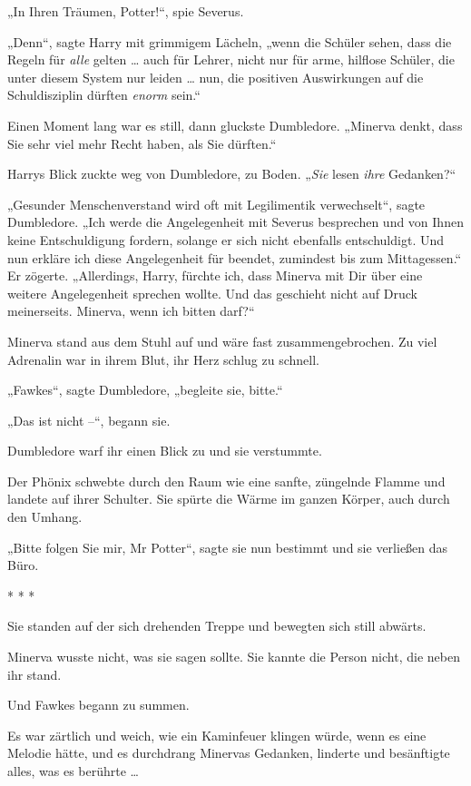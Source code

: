{„In Ihren Träumen, Potter!“, spie Severus.

„Denn“, sagte Harry mit grimmigem Lächeln, „wenn die Schüler sehen, dass die Regeln für \emph{alle} gelten … auch für Lehrer, nicht nur für arme, hilflose Schüler, die unter diesem System nur leiden … nun, die positiven Auswirkungen auf die Schuldisziplin dürften \emph{enorm} sein.“

Einen Moment lang war es still, dann gluckste Dumbledore. „Minerva denkt, dass Sie sehr viel mehr Recht haben, als Sie dürften.“

Harrys Blick zuckte weg von Dumbledore, zu Boden. „\emph{Sie} lesen \emph{ihre} Gedanken?“

„Gesunder Menschenverstand wird oft mit Legilimentik verwechselt“, sagte Dumbledore. „Ich werde die Angelegenheit mit Severus besprechen und von Ihnen keine Entschuldigung fordern, solange er sich nicht ebenfalls entschuldigt. Und nun erkläre ich diese Angelegenheit für beendet, zumindest bis zum Mittagessen.“ Er zögerte. „Allerdings, Harry, fürchte ich, dass Minerva mit Dir über eine weitere Angelegenheit sprechen wollte. Und das geschieht nicht auf Druck meinerseits. Minerva, wenn ich bitten darf?“

Minerva stand aus dem Stuhl auf und wäre fast zusammengebrochen. Zu viel Adrenalin war in ihrem Blut, ihr Herz schlug zu schnell.

„Fawkes“, sagte Dumbledore, „begleite sie, bitte.“

„Das ist nicht --“, begann sie.

Dumbledore warf ihr einen Blick zu und sie verstummte.

Der Phönix schwebte durch den Raum wie eine sanfte, züngelnde Flamme und landete auf ihrer Schulter. Sie spürte die Wärme im ganzen Körper, auch durch den Umhang.

„Bitte folgen Sie mir, Mr Potter“, sagte sie nun bestimmt und sie verließen das Büro.

* * *

Sie standen auf der sich drehenden Treppe und bewegten sich still abwärts.

Minerva wusste nicht, was sie sagen sollte. Sie kannte die Person nicht, die neben ihr stand.

Und Fawkes begann zu summen.

Es war zärtlich und weich, wie ein Kaminfeuer klingen würde, wenn es eine Melodie hätte, und es durchdrang Minervas Gedanken, linderte und besänftigte alles, was es berührte …

}
